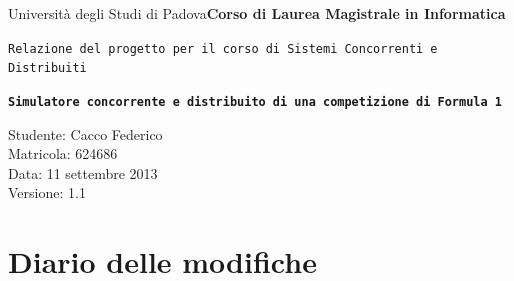 \documentclass[a4paper,11pt, twoside]{book}
\begin{document}
  \thispagestyle{empty}
    
  \begin{flushleft}
    {Università degli Studi di Padova}\linebreak[1]
    \textbf{Corso di Laurea \linebreak Magistrale in Informatica} \linebreak \linebreak \linebreak \linebreak
  \end{flushleft}
  
  \begin{center}
    {\texttt{Relazione del progetto per il corso di Sistemi Concorrenti e Distribuiti \linebreak \linebreak \linebreak \linebreak \linebreak}}
  \end{center}
  
  \begin{center}
    \texttt{\huge{\textbf{Simulatore concorrente e distribuito di una competizione di Formula 1}}} \linebreak \linebreak \linebreak \linebreak \linebreak \linebreak \linebreak \linebreak \linebreak
  \end{center}
  
  
  \begin{flushright}
    Studente: Cacco Federico\\Matricola: 624686\\Data: 11 settembre 2013\\Versione: 1.1
  \end{flushright}

  \newpage
  \setcounter{page}{1}
  
  \section*{Diario delle modifiche}
  
\end{document}
